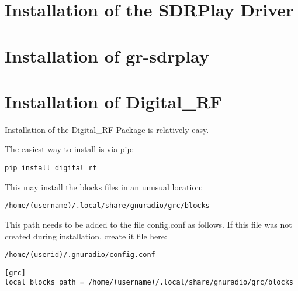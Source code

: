 \section{Installation of the SDRPlay Driver}

\section{Installation of gr-sdrplay}

\section{Installation of Digital_RF}

Installation of the Digital\_RF Package is relatively easy.

The easiest way to install is via pip:

\begin{verbatim}
pip install digital_rf
\end{verbatim}

This may install the blocks files in an unusual location:

\begin{verbatim}
/home/(username)/.local/share/gnuradio/grc/blocks
\end{verbatim}

This path needs to be added to the file config.conf as follows.
If this file was not created during installation, create it file here:

\begin{verbatim}
/home/(userid)/.gnuradio/config.conf
\end{verbatim}

\begin{verbatim}
[grc]
local_blocks_path = /home/(username)/.local/share/gnuradio/grc/blocks
\end{verbatim}









